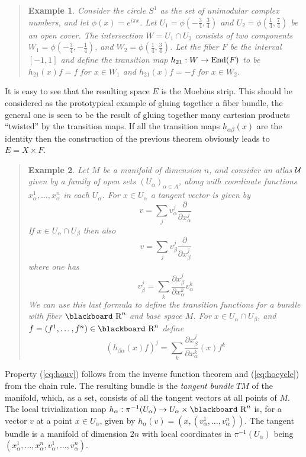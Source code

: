 \documentclass[12pt,titlepage]{article}
\def\bbf#1{\hbox{\blackboard #1}}
\def\lR{\bbf R}
\def\cU{{\cal U}}
\def\End{\hbox{End}}
\def\ppv#1#2{\frac{\partial}{\partial #1^#2}}
\newtheorem{eg}{Example}
\newenvironment{example}{\begin{quote}\begin{eg}}{\end{eg}\end{quote}}
\begin{document}
\begin{example}\label{ex:moebius}
Consider the circle \(S^1\) as the set of unimodular complex numbers,
and let \(\phi(x)=e^{i\pi x}\).
Let \(U_1=\phi(-\frac{3}{4},\frac{3}{4})\) 
and \(U_2=\phi(\frac{1}{4},\frac{7}{4})\) be an
open cover. The intersection \(W=U_1\cap U_2\) consists of two components
\(W_1=\phi(-\frac{3}{4},-\frac{1}{4})\), and 
\(W_2=\phi(\frac{1}{4},\frac{3}{4})\). Let the fiber
\(F\) be the interval \([-1,1]\) and define the transition map
\(h_{21}:W\to \End(F)\) to be \(h_{21}(x)f=f\) for \(x \in W_1\) and
\(h_{21}(x)f=-f\) for \(x \in W_2\). 
\end{example}%
It is easy to see that the resulting space
\(E\) is the Moebius strip. This should be considered as the
prototypical example of gluing together 
a fiber bundle, the general one is seen to be
the result of gluing together many cartesian products ``twisted'' by the
transition maps. If all the transition maps \(h_{\alpha\beta}(x)\) are
the identity then the construction of the previous theorem obviously
leads to \(E=X\times F\). 
\begin{example}\label{ex:tm}
Let \(M\) be a manifold of dimension \(n\),
and consider an atlas \(\cU\) given by a family
of open sets
\((U_\alpha)_{\alpha\in A}\), along with coordinate functions
\(x_\alpha^1,\dots,x_\alpha^n\) in each \(U_\alpha\). For \(x\in
U_\alpha\) a tangent vector is given by
\[
v=\sum_jv_\alpha^j\frac{\partial}{\partial x_\alpha^j}
\]
If \(x\in U_\alpha\cap U_\beta\) then also 
\[
v=\sum_jv_\beta^j\ppv{x_\beta}{j}
\]
where one has
\[
v_\beta^j = \sum_k \frac{\partial x_\beta^j}{\partial x_\alpha^k}
v_\alpha^k
\]
We can use this last formula to define the transition functions for a
bundle with fiber \(\lR^n\) and base space \(M\). For \(x\in
U_\alpha\cap U_\beta\), and \(f=(f^1,\dots,f^n)\in\lR^n\) define
\[
(h_{\beta\alpha}(x)f)^j=
\sum_k \frac{\partial x_\beta^j}{\partial x_\alpha^k}(x)f^k
\]
\end{example}%
Property (\ref{eq:houv}) follows from the 
inverse function  theorem and (\ref{eq:hocycle}) from the chain rule. 
The resulting bundle is the {\em tangent bundle\/}
%
\(TM\) of the manifold, which, as a set, consists of all the tangent vectors
at all points of \(M\).
The local trivialization map \(h_\alpha:\pi^{-1}(U_\alpha)\to
U_\alpha\times\lR^n\) is, for a vector \(v\) at a point \(x\in U_\alpha\),
given by \(h_\alpha(v) = (x,(v_\alpha^1, \dots, v_\alpha^n))\). The
tangent bundle is a manifold of dimension \(2n\) 
with local coordinates in \(\pi^{-
1}(U_\alpha)\) being \((x_\alpha^1,\dots,x_\alpha^n,v_\alpha^1, \dots,
v_\alpha^n)\). 
\end{document}
